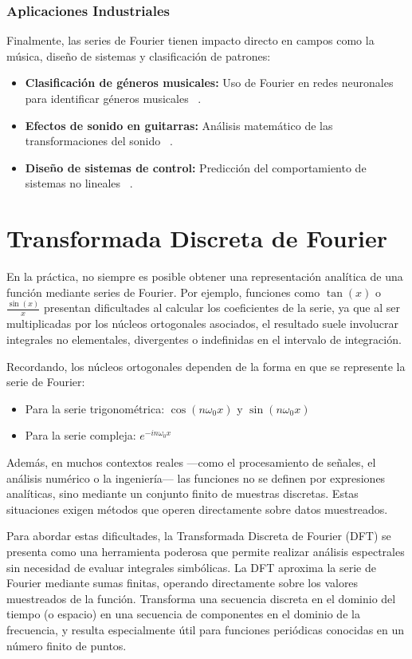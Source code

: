 \subsubsection{Aplicaciones Industriales}
Finalmente, las series de Fourier tienen impacto directo en campos como la música, diseño de sistemas y clasificación de patrones:
\begin{itemize}
	\item \textbf{Clasificación de géneros musicales:} Uso de Fourier en redes neuronales para identificar géneros musicales ~\cite{repositorioFourierARG}. 
	\item \textbf{Efectos de sonido en guitarras:} Análisis matemático de las transformaciones del sonido ~\cite{repositorioFourierARG}. 
	\item \textbf{Diseño de sistemas de control:} Predicción del comportamiento de sistemas no lineales ~\cite{repositorioFourierARG}. 
\end{itemize}

\section{Transformada Discreta de Fourier}

En la práctica, no siempre es posible obtener una representación analítica de una función mediante series de Fourier. Por ejemplo, funciones como \( \tan(x) \) o \( \frac{\sin(x)}{x} \) presentan dificultades al calcular los coeficientes de la serie, ya que al ser multiplicadas por los núcleos ortogonales asociados, el resultado suele involucrar integrales no elementales, divergentes o indefinidas en el intervalo de integración.

Recordando, los núcleos ortogonales dependen de la forma en que se represente la serie de Fourier:
\begin{itemize}
	\item Para la serie trigonométrica: \( \cos(n\omega_0 x) \) y \( \sin(n\omega_0 x) \)
	\item Para la serie compleja: \( e^{-i n \omega_0 x} \)
\end{itemize}

Además, en muchos contextos reales —como el procesamiento de señales, el análisis numérico o la ingeniería— las funciones no se definen por expresiones analíticas, sino mediante un conjunto finito de muestras discretas. Estas situaciones exigen métodos que operen directamente sobre datos muestreados.

Para abordar estas dificultades, la Transformada Discreta de Fourier (DFT) se presenta como una herramienta poderosa que permite realizar análisis espectrales sin necesidad de evaluar integrales simbólicas. La DFT aproxima la serie de Fourier mediante sumas finitas, operando directamente sobre los valores muestreados de la función. Transforma una secuencia discreta en el dominio del tiempo (o espacio) en una secuencia de componentes en el dominio de la frecuencia, y resulta especialmente útil para funciones periódicas conocidas en un número finito de puntos.

